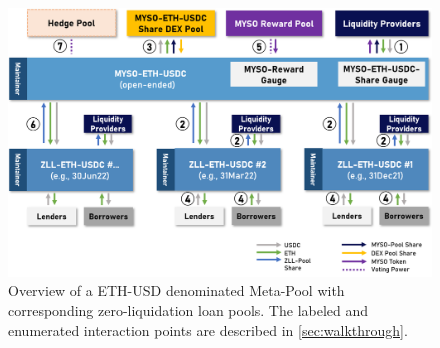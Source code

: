 \documentclass[a4paper]{article}
\begin{document}

\begin{figure}
    \centering
    \includegraphics[width=1.0\textwidth]{figures/meta-pool.png} 
    \cprotect\caption{\small Overview of a ETH-USD denominated Meta-Pool with corresponding zero-liquidation loan pools. The labeled and enumerated interaction points are described in \cref{sec:walkthrough}.}
    \label{fig:meta-pool}
\end{figure}
\end{document}
